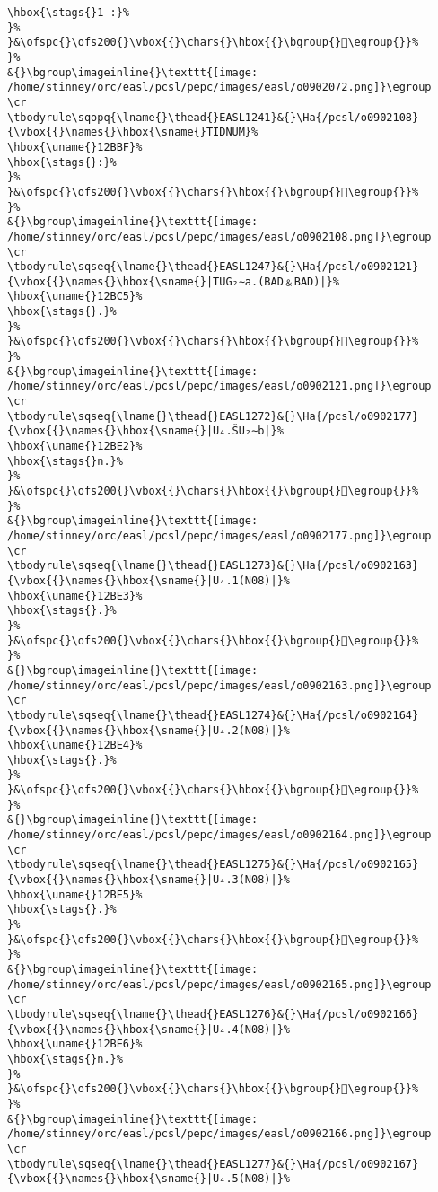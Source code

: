 \begin{verbatim}
\hbox{\stags{}1-:}%
}%
}&\ofspc{}\ofs200{}\vbox{{}\chars{}\hbox{{}\bgroup{}󲨒\egroup{}}%
}%
&{}\bgroup\imageinline{}\texttt{[image: /home/stinney/orc/easl/pcsl/pepc/images/easl/o0902072.png]}\egroup
\cr
\tbodyrule\sqopq{\lname{}\thead{}EASL1241}&{}\Ha{/pcsl/o0902108}{\vbox{{}\names{}\hbox{\sname{}TIDNUM}%
\hbox{\uname{}12BBF}%
\hbox{\stags{}:}%
}%
}&\ofspc{}\ofs200{}\vbox{{}\chars{}\hbox{{}\bgroup{}𒮿\egroup{}}%
}%
&{}\bgroup\imageinline{}\texttt{[image: /home/stinney/orc/easl/pcsl/pepc/images/easl/o0902108.png]}\egroup
\cr
\tbodyrule\sqseq{\lname{}\thead{}EASL1247}&{}\Ha{/pcsl/o0902121}{\vbox{{}\names{}\hbox{\sname{}|TUG₂∼a.(BAD﹠BAD)|}%
\hbox{\uname{}12BC5}%
\hbox{\stags{}.}%
}%
}&\ofspc{}\ofs200{}\vbox{{}\chars{}\hbox{{}\bgroup{}𒯅\egroup{}}%
}%
&{}\bgroup\imageinline{}\texttt{[image: /home/stinney/orc/easl/pcsl/pepc/images/easl/o0902121.png]}\egroup
\cr
\tbodyrule\sqseq{\lname{}\thead{}EASL1272}&{}\Ha{/pcsl/o0902177}{\vbox{{}\names{}\hbox{\sname{}|U₄.ŠU₂∼b|}%
\hbox{\uname{}12BE2}%
\hbox{\stags{}n.}%
}%
}&\ofspc{}\ofs200{}\vbox{{}\chars{}\hbox{{}\bgroup{}𒯢\egroup{}}%
}%
&{}\bgroup\imageinline{}\texttt{[image: /home/stinney/orc/easl/pcsl/pepc/images/easl/o0902177.png]}\egroup
\cr
\tbodyrule\sqseq{\lname{}\thead{}EASL1273}&{}\Ha{/pcsl/o0902163}{\vbox{{}\names{}\hbox{\sname{}|U₄.1(N08)|}%
\hbox{\uname{}12BE3}%
\hbox{\stags{}.}%
}%
}&\ofspc{}\ofs200{}\vbox{{}\chars{}\hbox{{}\bgroup{}𒯣\egroup{}}%
}%
&{}\bgroup\imageinline{}\texttt{[image: /home/stinney/orc/easl/pcsl/pepc/images/easl/o0902163.png]}\egroup
\cr
\tbodyrule\sqseq{\lname{}\thead{}EASL1274}&{}\Ha{/pcsl/o0902164}{\vbox{{}\names{}\hbox{\sname{}|U₄.2(N08)|}%
\hbox{\uname{}12BE4}%
\hbox{\stags{}.}%
}%
}&\ofspc{}\ofs200{}\vbox{{}\chars{}\hbox{{}\bgroup{}𒯤\egroup{}}%
}%
&{}\bgroup\imageinline{}\texttt{[image: /home/stinney/orc/easl/pcsl/pepc/images/easl/o0902164.png]}\egroup
\cr
\tbodyrule\sqseq{\lname{}\thead{}EASL1275}&{}\Ha{/pcsl/o0902165}{\vbox{{}\names{}\hbox{\sname{}|U₄.3(N08)|}%
\hbox{\uname{}12BE5}%
\hbox{\stags{}.}%
}%
}&\ofspc{}\ofs200{}\vbox{{}\chars{}\hbox{{}\bgroup{}𒯥\egroup{}}%
}%
&{}\bgroup\imageinline{}\texttt{[image: /home/stinney/orc/easl/pcsl/pepc/images/easl/o0902165.png]}\egroup
\cr
\tbodyrule\sqseq{\lname{}\thead{}EASL1276}&{}\Ha{/pcsl/o0902166}{\vbox{{}\names{}\hbox{\sname{}|U₄.4(N08)|}%
\hbox{\uname{}12BE6}%
\hbox{\stags{}n.}%
}%
}&\ofspc{}\ofs200{}\vbox{{}\chars{}\hbox{{}\bgroup{}𒯦\egroup{}}%
}%
&{}\bgroup\imageinline{}\texttt{[image: /home/stinney/orc/easl/pcsl/pepc/images/easl/o0902166.png]}\egroup
\cr
\tbodyrule\sqseq{\lname{}\thead{}EASL1277}&{}\Ha{/pcsl/o0902167}{\vbox{{}\names{}\hbox{\sname{}|U₄.5(N08)|}%

\end{verbatim}

